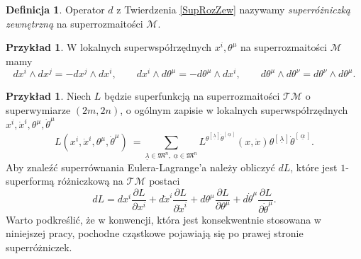 \documentclass[11pt,a4paper]{report}
\theoremstyle{definition}
\newtheorem{example}[theorem]{Przykład}
\newtheorem{definition}[theorem]{Definicja}
\begin{document}
\begin{definition}
Operator $d$ z Twierdzenia \ref{SupRozZew} nazywamy \textit{superróżniczką zewnętrzną} na superrozmaitości $\mathcal M$.
\end{definition}

\begin{example}
W lokalnych superwspółrzędnych $x^i, \theta^\mu$ na superrozmaitości $\mathcal{M}$ mamy
\begin{equation*}
dx^i\wedge dx^j=-dx^j\wedge dx^i,\qquad dx^i\wedge d\theta^\mu=-d\theta^\mu \wedge dx^i,\qquad d\theta^\mu \wedge d\theta^\nu =d\theta^\nu \wedge d\theta^\mu.
\end{equation*}\end{example}

\begin{example} Niech $L$ będzie superfunkcją na superrozmaitości $\mathcal{TM}$ o superwymiarze $(2m, 2n)$, o ogólnym zapisie w lokalnych superwspółrzędnych $x^i, \dot x^i, \theta^\mu, \dot \theta^\mu$
\begin{equation*}
L (x^i, \dot x^i, \theta^\mu, \dot \theta^\mu) \ = \!\!\!\!\!\!\!\!
  \sum_{\underline{\lambda} \in \mathfrak{M}^n,\; \underline{\alpha} \in \mathfrak{M}^n} \!\!\!\!\!\!\!\! L^{\theta^{\left[\, \underline{\lambda}\, \right]} \dot \theta^{\left[\, \underline{\alpha}\, \right]}} (x, \dot x) \theta^{\left[\, \underline{\lambda}\, \right]} \dot \theta^{\left[\, \underline{\alpha}\, \right]}.
\end{equation*}
Aby znaleźć superrównania Eulera-Lagrange'a należy obliczyć $dL$, które jest $1$-superformą różniczkową na $\mathcal{TM}$ postaci
\begin{equation*}
dL = dx^i\frac{\partial L}{\partial x^i}+d\dot x^i\frac{\partial L}{\partial \dot x^i}+d\theta^\mu\frac{\partial L}{\partial \theta^\mu}+d\dot \theta^\mu\frac{\partial L}{\partial \dot\theta^\mu}.
\end{equation*}
Warto podkreślić, że w konwencji, która jest konsekwentnie stosowana w niniejszej pracy, pochodne cząstkowe pojawiają się po prawej stronie superróżniczek.


\end{example}
\end{document}
